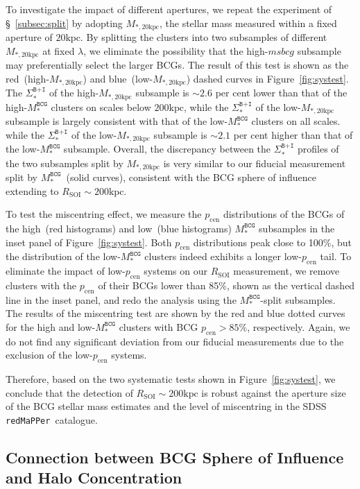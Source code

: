 \documentclass[fleqn,usenatbib]{mnras}
\newcommand{\rsoi}{R_{\mathrm{SOI}}}
\newcommand{\sigbi}{\Sigma_*^{\texttt{B+I}}}
\newcommand{\msbcg}{M_*^{\texttt{BCG}}}
\newcommand{\mtwenty}{M_{*,20\kpc}}
\newcommand{\kpc}{\mathrm{kpc}}
\newcommand{\pcen}{p_{\mathrm{cen}}}
\newcommand\xkchen[1]{{\color{cyan} {#1}}}
\newcommand\redmapper{\texttt{redMaPPer}}
\begin{document}
To investigate the impact of different apertures, we repeat the experiment
of \S~\ref{subsec:split} by adopting $\mtwenty$, the stellar mass measured
within a fixed aperture of $20\kpc$. By splitting the clusters into two
subsamples of different $\mtwenty$ at fixed $\lambda$, we eliminate the
possibility that the high-$msbcg$ subsample may preferentially select the
larger BCGs. The result of this test is shown as the red~(high-$\mtwenty$)
and blue~(low-$\mtwenty$) dashed curves in Figure~\ref{fig:systest}.  The
$\sigbi$ of the high-$\mtwenty$ subsample is \xkchen{$\sim2.6$} per cent lower than that
of the high-$\msbcg$ clusters on scales below $200\kpc$, while the $\sigbi$
of the low-$\mtwenty$ subsample is largely consistent with that of the
low-$\msbcg$ clusters on all scales.\xkchen{while the $\sigbi$ of the low-$\mtwenty$ subsample is $\sim2.1$ per cent higher than that of the low-$\msbcg$ subsample.} Overall, the discrepancy between the
$\sigbi$ profiles of the two subsamples split by $\mtwenty$ is very similar
to our fiducial measurement split by $\msbcg$~(solid curves), consistent
with the BCG sphere of influence extending to $\rsoi{\sim}200\kpc$.



To test the miscentring effect, we measure the $\pcen$ distributions of the
BCGs of the high~(red histograms) and low~(blue histograms) $\msbcg$
subsamples in the inset panel of Figure~\ref{fig:systest}.  Both $\pcen$
distributions peak close to 100\%, but the distribution of the low-$\msbcg$
clusters indeed exhibits a longer low-$\pcen$ tail. To eliminate the impact
of low-$\pcen$ systems on our $\rsoi$ measurement, we remove clusters with
the $\pcen$ of their BCGs lower than 85\%, shown as the vertical dashed
line in the inset panel, and redo the analysis using the $\msbcg$-split
subsamples.  The results of the miscentring test are shown by the red and
blue dotted curves for the high and low-$\msbcg$ clusters with BCG
$\pcen{>}85\%$, respectively. Again, we do not find any significant
deviation from our fiducial measurements due to
the exclusion of the low-$\pcen$ systems.


Therefore, based on the two systematic tests shown in
Figure~\ref{fig:systest}, we conclude that the detection of
$\rsoi{\sim}200\kpc$ is robust against the aperture size of the BCG
stellar mass estimates and the level of miscentring in the SDSS
\redmapper~catalogue.




\subsection{Connection between BCG Sphere of Influence and Halo Concentration}
\label{subsec:physics}
\end{document}
